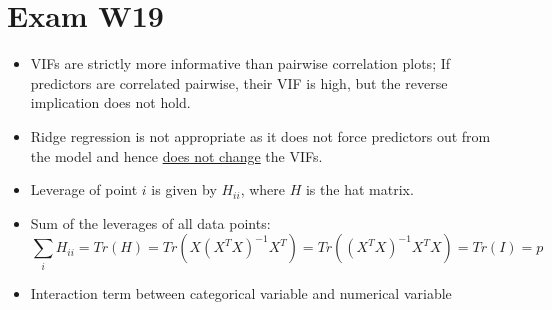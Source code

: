 \documentclass[a4paper]{article}
\begin{document}
\section{Exam W19}
\begin{itemize}
    \item VIFs are strictly more informative than pairwise correlation plots; If predictors are correlated pairwise, their VIF is high, but the reverse implication does not hold.
    \item Ridge regression is not appropriate as it does not force predictors out from the model and hence \underline{does not change}  the VIFs.
    \item Leverage of point $i$ is given by $H_{ii}$, where $H$ is the hat matrix.
    \item Sum of the leverages of all data points:
    \[\sum_iH_{ii}=Tr(H)=Tr(X(X^TX)^{-1}X^T)=Tr((X^TX)^{-1}X^TX)=Tr(I)=p \]
    \item Interaction term between categorical variable and numerical variable
\end{itemize}
\end{document}
